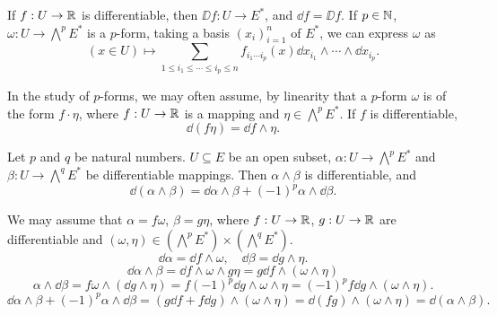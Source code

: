 \begin{exampleenv}
    If $f : U \rightarrow \mathbb{R}$ is differentiable, then $\DD f : U \rightarrow E^*$, and $\dd f = \DD f$.
    If $p \in \mathbb{N}$, $\omega : U \rightarrow \bigwedge^p E^*$ is a $p$-form,
    taking a basis $(x_i)_{i=1}^n$ of $E^*$, we can express $\omega$ as
    $$(x \in U) \longmapsto \sum_{1 \le i_1 \le \cdots \le i_p \le n} f_{i_1 \cdots i_p} (x) \dd x_{i_1} \wedge \cdots \wedge \dd x_{i_p}.$$
\end{exampleenv}

\begin{remark}
    In the study of $p$-forms, we may often assume, by linearity that a $p$-form $\omega$ is of the form $f\cdot\eta$, where $f : U \rightarrow \mathbb{R}$ is a mapping and $\eta \in \bigwedge^{p} E^*$.
    If $f$ is differentiable,
    $$\dd(f \eta) = \dd f \wedge \eta.$$
\end{remark}

\begin{propositionenv}
    Let $p$ and $q$ be natural numbers. $U \subseteq E$ be an open subset, $\alpha : U \rightarrow \bigwedge^p E^*$ and $\beta : U \rightarrow \bigwedge^q E^*$ be differentiable mappings.
    Then $\alpha \wedge \beta$ is differentiable, and
    $$\dd(\alpha \wedge \beta) = \dd \alpha \wedge \beta + (-1)^p \alpha \wedge \dd \beta.$$
\end{propositionenv}
\begin{proofenv}
    We may assume that $\alpha = f \omega$, $\beta = g \eta$, where $f: U \rightarrow \mathbb{R}$, $g: U \rightarrow \mathbb{R}$ are differentiable and $(\omega,\eta) \in (\bigwedge^p E^*)\times (\bigwedge^q E^*)$.
    $$\dd \alpha = \dd f \wedge \omega,\quad \dd \beta = \dd g \wedge \eta.$$
    $$\dd \alpha \wedge \beta = \dd f \wedge \omega \wedge g \eta = g \dd f \wedge (\omega \wedge \eta)$$
    $$\alpha \wedge \dd \beta = f \omega \wedge (\dd g \wedge \eta) = f (-1)^p \dd g \wedge \omega \wedge \eta = (-1)^p f \dd g \wedge (\omega \wedge \eta).$$
    $$\dd \alpha \wedge \beta + (-1)^p \alpha \wedge \dd \beta = (g \dd f + f \dd g)\wedge (\omega \wedge \eta) = \dd(fg)\wedge (\omega \wedge \eta) = \dd (\alpha \wedge \beta).$$
\end{proofenv}

